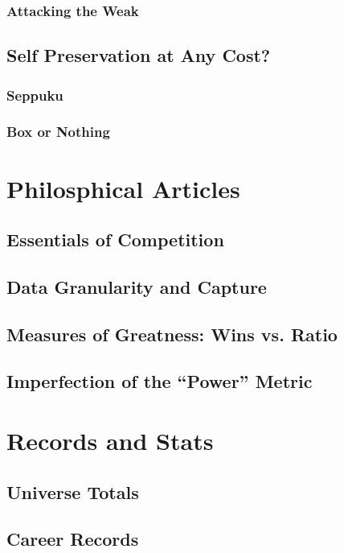 \documentclass[a4paper,twoside,titlepage]{book}
\begin{document}
      \section{Attacking the Weak}
    \chapter{Self Preservation at Any Cost?}
      \section{Seppuku}
      \section{Box or Nothing}
  \part{Philosphical Articles}
    \chapter{Essentials of Competition}
    \chapter{Data Granularity and Capture}
    \chapter{Measures of Greatness: Wins vs. Ratio}
    \chapter{Imperfection of the ``Power'' Metric}
  \part{Records and Stats}
    \chapter{Universe Totals}
    \chapter{Career Records}
\end{document}
